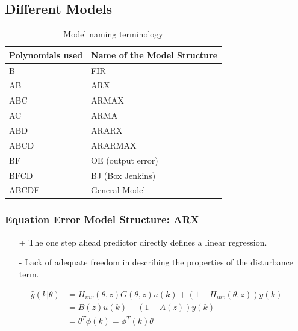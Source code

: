 \documentclass[10pt,a4paper]{scrartcl}
\begin{document}
\begin{multicols*}{2}
\subsection{Different Models}

\begin{table}[H]
\begin{center}
\begin{tabular}{ll}
Polynomials used&Name of the Model Structure\\
\hline
B&FIR\\
AB&ARX\\
ABC&ARMAX\\
AC&ARMA\\
ABD&ARARX\\
ABCD&ARARMAX\\
BF&OE (output error)\\
BFCD&BJ (Box Jenkins)\\
ABCDF&General Model\\
\hline
\end{tabular}
\end{center}
\caption{Model naming terminology}
\end{table}

\subsubsection{Equation Error Model Structure: ARX}




\begin{itemize}
\item[+] The one step ahead predictor directly defines a linear regression.
\item[-] Lack of adequate freedom in describing the properties of the disturbance term.
\end{itemize}

\begin{align*}
\hat{y}(k|\theta)&=H_{inv}(\theta,z)G(\theta,z)u(k)+(1-H_{inv}(\theta,z))y(k)\\
&=B(z)u(k)+(1-A(z))y(k)\\
&=\theta^T\phi(k)=\phi^T(k)\theta
\end{align*}


\end{multicols*}
\end{document}
